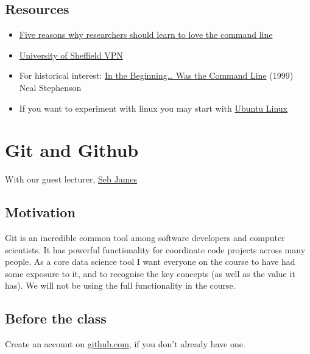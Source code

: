 \documentclass[
]{book}
\providecommand{\tightlist}{%
  \setlength{\itemsep}{0pt}\setlength{\parskip}{0pt}}
\begin{document}
\hypertarget{resources-7}{%
\section{Resources}\label{resources-7}}

\begin{itemize}
\tightlist
\item
  \href{https://www.nature.com/articles/d41586-021-00263-0}{Five reasons why researchers should learn to love the command line}
\item
  \href{https://www.sheffield.ac.uk/it-services/vpn}{University of Sheffield VPN}
\item
  For historical interest: \href{http://cristal.inria.fr/~weis/info/commandline.html}{In the Beginning\ldots{} Was the Command Line} (1999) Neal Stephenson
\item
  If you want to experiment with linux you may start with \href{https://ubuntu.com/download/desktop}{Ubuntu Linux}
\end{itemize}

\hypertarget{git-and-github}{%
\chapter{Git and Github}\label{git-and-github}}

With our guest lecturer, \href{https://www.sheffield.ac.uk/psychology/people/research/sebastian-james-0}{Seb James}

\hypertarget{motivation-1}{%
\section{Motivation}\label{motivation-1}}

Git is an incredible common tool among software developers and computer scientists. It has powerful functionality for coordinate code projects across many people. As a core data science tool I want everyone on the course to have had some exposure to it, and to recognise the key concepts (as well as the value it has). We will not be using the full functionality in the course.

\hypertarget{before-the-class}{%
\section{Before the class}\label{before-the-class}}

Create an account on \href{https://github.com/}{github.com}, if you don't already have one.
\end{document}
